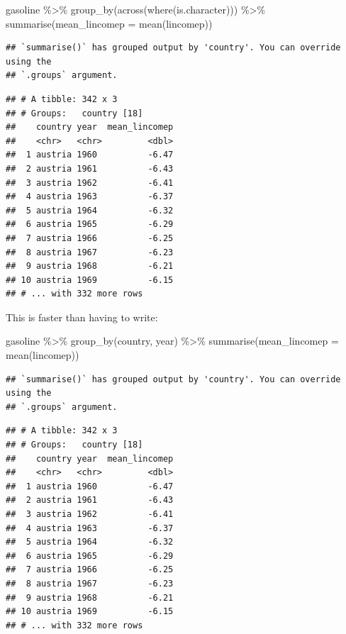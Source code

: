 \documentclass[
]{article}
\newenvironment{Shaded}{\begin{snugshade}}{\end{snugshade}}
\newcommand{\AttributeTok}[1]{\textcolor[rgb]{0.77,0.63,0.00}{#1}}
\newcommand{\FunctionTok}[1]{\textcolor[rgb]{0.00,0.00,0.00}{#1}}
\newcommand{\NormalTok}[1]{#1}
\newcommand{\SpecialCharTok}[1]{\textcolor[rgb]{0.00,0.00,0.00}{#1}}
\begin{document}
\begin{Shaded}
\begin{Highlighting}[]
\NormalTok{gasoline }\SpecialCharTok{\%\textgreater{}\%}
  \FunctionTok{group\_by}\NormalTok{(}\FunctionTok{across}\NormalTok{(}\FunctionTok{where}\NormalTok{(is.character))) }\SpecialCharTok{\%\textgreater{}\%}
  \FunctionTok{summarise}\NormalTok{(}\AttributeTok{mean\_lincomep =} \FunctionTok{mean}\NormalTok{(lincomep))}
\end{Highlighting}
\end{Shaded}

\begin{verbatim}
## `summarise()` has grouped output by 'country'. You can override using the
## `.groups` argument.
\end{verbatim}

\begin{verbatim}
## # A tibble: 342 x 3
## # Groups:   country [18]
##    country year  mean_lincomep
##    <chr>   <chr>         <dbl>
##  1 austria 1960          -6.47
##  2 austria 1961          -6.43
##  3 austria 1962          -6.41
##  4 austria 1963          -6.37
##  5 austria 1964          -6.32
##  6 austria 1965          -6.29
##  7 austria 1966          -6.25
##  8 austria 1967          -6.23
##  9 austria 1968          -6.21
## 10 austria 1969          -6.15
## # ... with 332 more rows
\end{verbatim}

This is faster than having to write:

\begin{Shaded}
\begin{Highlighting}[]
\NormalTok{gasoline }\SpecialCharTok{\%\textgreater{}\%}
    \FunctionTok{group\_by}\NormalTok{(country, year) }\SpecialCharTok{\%\textgreater{}\%}
    \FunctionTok{summarise}\NormalTok{(}\AttributeTok{mean\_lincomep =} \FunctionTok{mean}\NormalTok{(lincomep))}
\end{Highlighting}
\end{Shaded}

\begin{verbatim}
## `summarise()` has grouped output by 'country'. You can override using the
## `.groups` argument.
\end{verbatim}

\begin{verbatim}
## # A tibble: 342 x 3
## # Groups:   country [18]
##    country year  mean_lincomep
##    <chr>   <chr>         <dbl>
##  1 austria 1960          -6.47
##  2 austria 1961          -6.43
##  3 austria 1962          -6.41
##  4 austria 1963          -6.37
##  5 austria 1964          -6.32
##  6 austria 1965          -6.29
##  7 austria 1966          -6.25
##  8 austria 1967          -6.23
##  9 austria 1968          -6.21
## 10 austria 1969          -6.15
## # ... with 332 more rows
\end{verbatim}
\end{document}
